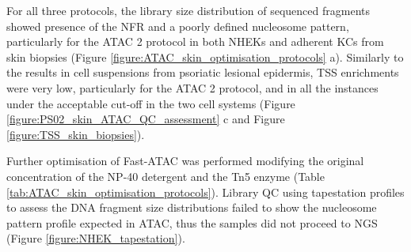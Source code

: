 For all three protocols, the library size distribution of sequenced fragments showed presence of the NFR and a poorly defined nucleosome pattern, particularly for the ATAC 2 protocol in both NHEKs and adherent KCs from skin biopsies (Figure \ref{figure:ATAC_skin_optimisation_protocols} a). Similarly to the results in cell suspensions from psoriatic lesional epidermis, TSS enrichments were very low, particularly for the ATAC 2 protocol, and in all the instances under the acceptable cut-off in the two cell systems (Figure \ref{figure:PS02_skin_ATAC_QC_assessment} c and Figure \ref{figure:TSS_skin_biopsies}).

Further optimisation of Fast-ATAC was performed modifying the original concentration of the NP-40 detergent and the Tn5 enzyme (Table \ref{tab:ATAC_skin_optimisation_protocols}). Library QC using tapestation profiles to assess the DNA fragment size distributions failed to show the nucleosome pattern profile expected in ATAC, thus the samples did not proceed to NGS (Figure \ref{figure:NHEK_tapestation}).

 

